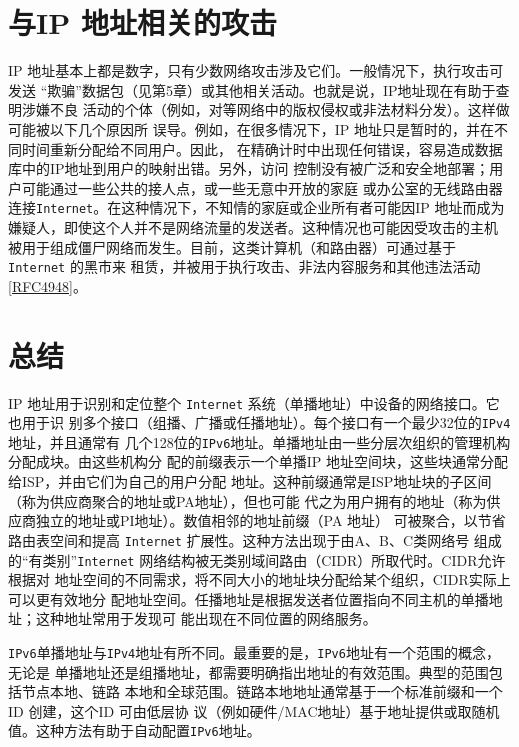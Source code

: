 \section{与IP 地址相关的攻击}

IP 地址基本上都是数字，只有少数网络攻击涉及它们。一般情况下，执行攻击可发送
“欺骗”数据包（见第5章）或其他相关活动。也就是说，IP地址现在有助于查明涉嫌不良
活动的个体（例如，对等网络中的版权侵权或非法材料分发）。这样做可能被以下几个原因所
误导。例如，在很多情况下，IP 地址只是暂时的，并在不同时间重新分配给不同用户。因此，
在精确计时中出现任何错误，容易造成数据库中的IP地址到用户的映射出错。另外，访问
控制没有被广泛和安全地部署；用户可能通过一些公共的接人点，或一些无意中开放的家庭
或办公室的无线路由器连接\verb|Internet|。在这种情况下，不知情的家庭或企业所有者可能因IP
地址而成为嫌疑人，即使这个人并不是网络流量的发送者。这种情况也可能因受攻击的主机
被用于组成僵尸网络而发生。目前，这类计算机（和路由器）可通过基于 \verb|Internet| 的黑市来
租赁，并被用于执行攻击、非法内容服务和其他违法活动\href{https://www.rfc-editor.org/rfc/rfc4948}{[RFC4948]}。

\section{总结}

IP 地址用于识别和定位整个 \verb|Internet| 系统（单播地址）中设备的网络接口。它也用于识
别多个接口（组播、广播或任播地址）。每个接口有一个最少32位的\verb|IPv4|地址，并且通常有
几个128位的\verb|IPv6|地址。单播地址由一些分层次组织的管理机构分配成块。由这些机构分
配的前缀表示一个单播IP 地址空间块，这些块通常分配给ISP，并由它们为自己的用户分配
地址。这种前缀通常是ISP地址块的子区间（称为供应商聚合的地址或PA地址），但也可能
代之为用户拥有的地址（称为供应商独立的地址或PI地址）。数值相邻的地址前缀（PA 地址）
可被聚合，以节省路由表空间和提高 \verb|Internet| 扩展性。这种方法出现于由A、B、C类网络号
组成的“有类别”\verb|Internet| 网络结构被无类别域间路由（CIDR）所取代时。CIDR允许根据对
地址空间的不同需求，将不同大小的地址块分配给某个组织，CIDR实际上可以更有效地分
配地址空间。任播地址是根据发送者位置指向不同主机的单播地址；这种地址常用于发现可
能出现在不同位置的网络服务。

\verb|IPv6|单播地址与\verb|IPv4|地址有所不同。最重要的是，\verb|IPv6|地址有一个范围的概念，无论是
单播地址还是组播地址，都需要明确指出地址的有效范围。典型的范围包括节点本地、链路
本地和全球范围。链路本地地址通常基于一个标准前缀和一个ID 创建，这个ID 可由低层协
议（例如硬件/MAC地址）基于地址提供或取随机值。这种方法有助于自动配置\verb|IPv6|地址。

